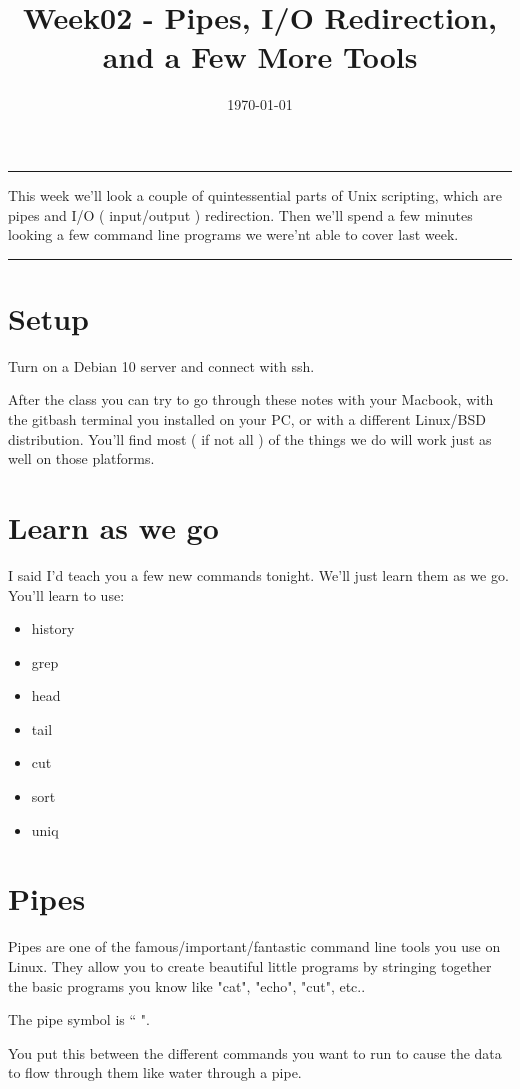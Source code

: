\documentclass[12pt,a4paper]{article}
\renewenvironment{abstract}{%
\hfill\begin{minipage}{0.95\textwidth}
\rule{\textwidth}{1pt}}
{\par\noindent\rule{\textwidth}{1pt}\end{minipage}}
\begin{document}
%
\title{\textbf{Week02 - Pipes, I/O Redirection, and a Few More Tools}}
\date{\today}
%
\maketitle
%
\begin{abstract}
This week we'll look a couple of quintessential parts of Unix scripting, which
are pipes and I/O ( input/output ) redirection. Then we'll spend a few minutes
looking a few command line programs we were'nt able to cover last week.
\end{abstract}

\section{Setup}
Turn on a Debian 10 server and connect with ssh. 

After the class you can try to go through these notes with your Macbook, with
the gitbash terminal you installed on your PC, or with a different Linux/BSD
distribution. You'll find most ( if not all ) of the things we do will work just
as well on those platforms.

\section{Learn as we go}
I said I'd teach you a few new commands tonight. We'll just learn them as we go.
You'll learn to use:
\begin{itemize}
\item history
\item grep
\item head
\item tail
\item cut
\item sort
\item uniq
\end{itemize}

\section{Pipes}
Pipes are one of the famous/important/fantastic command line tools you use on
Linux. They allow you to create beautiful little programs  by stringing together
the basic programs you know like "cat", "echo", "cut", etc..

The pipe symbol is ``\textbar{} ".

You put this between the different commands you want to run to cause the data to
flow through them like water through a pipe.
 
\end{document}

